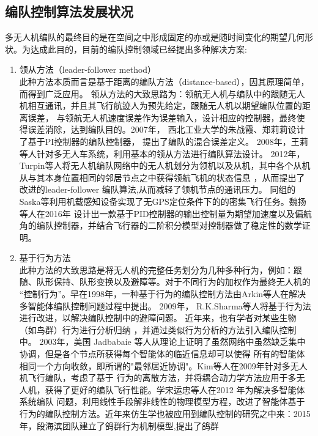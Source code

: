 \subsection{编队控制算法发展状况}
多无人机编队的最终目的是在空间之中形成固定的亦或是随时间变化的期望几何形状。为达成此目的，目前的编队控制领域已经提出多种解决方案:
\begin{enumerate}
    \item 领从方法（leader-follower method）\\
        此种方法本质而言是基于距离的编队方法（distance-based），因其原理简单，而得到广泛应用。
        领从方法的大致思路为：领航无人机与编队中的跟随无人机相互通讯，并且其飞行航迹人为预先给定，跟随无人机以期望编队位置的距离误差，
        与领航无人机速度误差作为误差输入，设计相应的控制器，最终使得误差消除，达到编队目的。2007年，
        西北工业大学的朱战霞、郑莉莉设计了基于PI控制器的编队控制器，
        提出了编队的混合误差定义。\cite{ZhuZhanXia2007}
        2008年，王莉等人针对多无人车系统，利用基本的领从方法进行编队算法设计。\cite{WangLi2008}
        2012年，Turpin等人将无人机编队网络中的无人机划分为领机以及从机，其中各个从机从与其本身位置相同的邻居节点之中获得领航飞机的状态信息
        ，从而提出了改进的leader-follower 编队算法,从而减轻了领机节点的通讯压力。
        \cite{Turpin2012Trajectory}同组的Saska等利用机载感知设备实现了无GPS定位条件下的的密集飞行任务。\cite{Saska2017System}魏扬等人在2016年
        设计出一款基于PID控制器的输出控制量为期望加速度以及偏航角的编队控制器，并结合飞行器的二阶积分模型对控制器做了稳定性的数学证明。\cite{WeiYang2016}
    \item 基于行为方法\\
        此种方法的大致思路是将无人机的完整任务划分为几种多种行为，例如：跟随、队形保持、队形变换以及避障等。对于不同行为的加权作为最终无人机的
        “控制行为”。早在1998年，一种基于行为的编队控制方法由Arkin等人在解决多智能体编队控制问题过程中提出。\cite{Balch1998Behavior} 2009年，
        R.K.Sharma等人将基于行为法进行改进，以解决编队控制中的避障问题。\cite{Sharma2009Collision} 近年来，也有学者对某些生物（如鸟群）行为进行分析归纳
        ，并通过类似行为分析的方法引入编队控制中。
        2003年，美国 Jadbabaie 等人从理论上证明了虽然网络中虽然缺乏集中协调，但是各个节点所获得每个智能体的临近信息却可以使得
        所有的智能体相同一个方向收敛，即所谓的"最邻居近协调"。\cite{Jadbabaie2003Coordination}Kim等人在2009年针对多无人机飞行编队，考虑了基于
        行为的离散方法，并将耦合动力学方法应用于多无人机，获得了更好的编队飞行性能。\cite{Kim2009}学宋运忠等人在2012 年为解决多智能体系统编队
        问题，利用线性手段解非线性的物理模型方程，改进了智能体基于行为的编队控制方法。\cite{SongYunZhong2012}近年来仿生学也被应用到编队控制的研究之中来：2015年，段海滨团队建立了鸽群行为机制模型,提出了鸽群

\end{enumerate}
